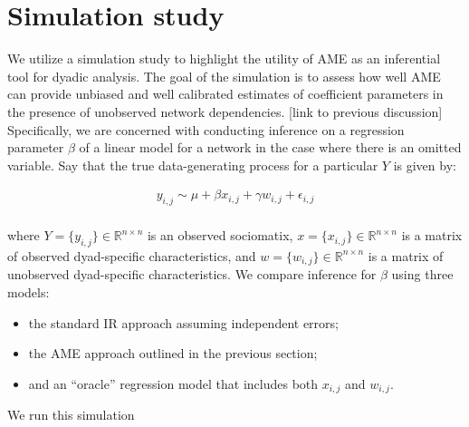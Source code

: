 \section{Simulation study}

We utilize a simulation study to highlight the utility of AME as an inferential tool for dyadic analysis. The goal of the simulation is to assess how well AME can provide unbiased and well calibrated estimates of coefficient parameters in the presence of unobserved network dependencies. [link to previous discussion] Specifically, we are concerned with conducting inference on a regression parameter $\beta$ of a linear model for a network in the case where there is an omitted variable. Say that the true data-generating process for a particular $Y$ is given by:

\begin{align*}
	y_{i,j} \sim  \mu + \beta x_{i,j} + \gamma w_{i,j} + \epsilon_{i,j} \\
	\label{eqn:sim}
\end{align*}

where $Y= \{y_{i,j}\}\in \mathbb R^{n\times n}$ is an observed sociomatix, $x = \{x_{i,j} \} \in \mathbb R^{n \times n}$ is a matrix of observed dyad-specific characteristics, and $w = \{ w_{i,j}\} \in \mathbb R^{n \times n}$ is a matrix of unobserved dyad-specific characteristics. We compare inference for $\beta$ using three models:

\begin{itemize}
	\item the standard IR approach assuming independent errors; 
	\item the AME approach outlined in the previous section;
	\item and an ``oracle'' regression model that includes both $x_{i,j}$ and $w_{i,j}$. 
\end{itemize}

We run this simulation 

